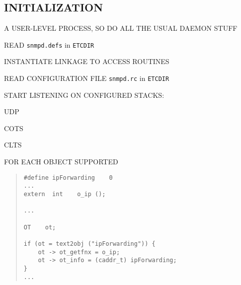 \begin{bwslide}
\part*	{INITIALIZATION}\bf

\begin{nrtc}
\item	A USER-LEVEL PROCESS, SO DO ALL THE USUAL DAEMON STUFF

\item	READ \verb"snmpd.defs" in \verb"ETCDIR"

\item	INSTANTIATE LINKAGE TO ACCESS ROUTINES

\item	READ CONFIGURATION FILE \verb"snmpd.rc" in \verb"ETCDIR"

\item	START LISTENING ON CONFIGURED STACKS:
    \begin{nrtc}
    \item	UDP

    \item	COTS

    \item	CLTS
    \end{nrtc}
\end{nrtc}
\end{bwslide}


\begin{bwslide}

\begin{nrtc}
\item	FOR EACH OBJECT SUPPORTED
\begin{quote}\small\begin{verbatim}
#define ipForwarding    0
...
extern  int    o_ip ();

...

OT    ot;

if (ot = text2obj ("ipForwarding")) {
    ot -> ot_getfnx = o_ip;
    ot -> ot_info = (caddr_t) ipForwarding;
}
...
\end{verbatim}\end{quote}
\end{nrtc}
\end{bwslide}


